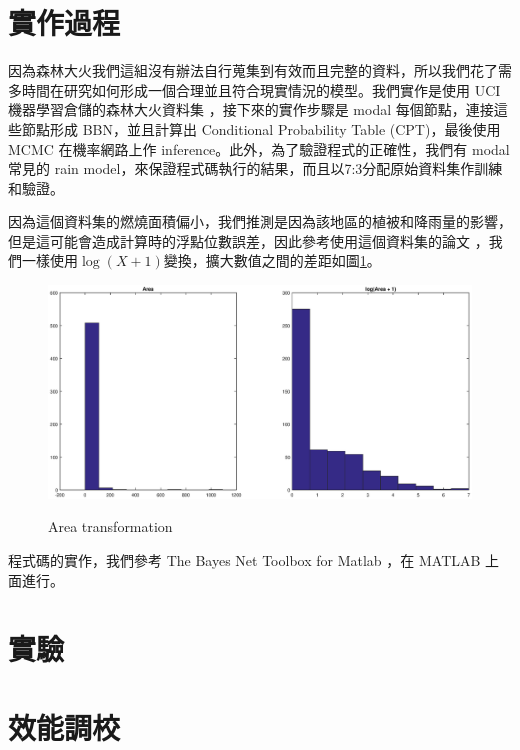 \documentclass[a4paper]{article}
\begin{document}
\section{實作過程}
因為森林大火我們這組沒有辦法自行蒐集到有效而且完整的資料，所以我們花了需多時間在研究如何形成一個合理並且符合現實情況的模型。我們實作是使用 UCI 機器學習倉儲的森林大火資料集 \cite{UCIFF}，接下來的實作步驟是 modal 每個節點，連接這些節點形成 BBN，並且計算出 Conditional Probability Table (CPT)，最後使用 MCMC 在機率網路上作 inference。此外，為了驗證程式的正確性，我們有 modal 常見的 rain model，來保證程式碼執行的結果，而且以7:3分配原始資料集作訓練和驗證。

因為這個資料集的燃燒面積偏小，我們推測是因為該地區的植被和降雨量的影響，但是這可能會造成計算時的浮點位數誤差，因此參考使用這個資料集的論文 \cite{dataset}，我們一樣使用$\log(X+1)$變換，擴大數值之間的差距如圖\ref{area}。

\begin{figure}[h]
  \caption{Area transformation}
  \centering
  \includegraphics[width=1\textwidth]{area}
  \label{area}
\end{figure}

程式碼的實作，我們參考 The Bayes Net Toolbox for Matlab \cite{bnet}，在 MATLAB 上面進行。

\section{實驗}

\section{效能調校}



\end{document}
